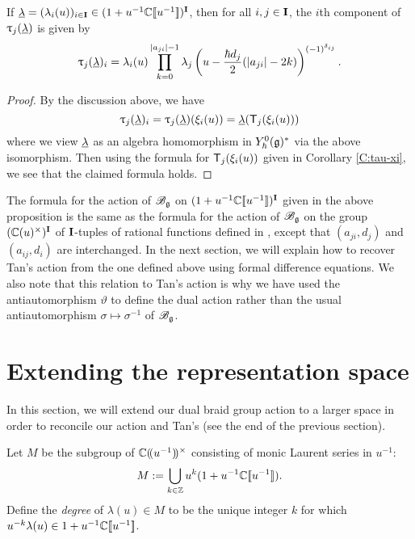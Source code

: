 \begin{proposition}\label{P:Tan-formula}
    If $\ul = (\lambda_i(u))_{i\in\I}\in (1+u^{-1}\C\db{u^{-1}})^\I$, then for all $i,j\in\I$, the $i$th component of $\braid_j(\ul)$ is given by
    \[\braid_j(\ul)_i = \lambda_i(u)\prod_{k=0}^{\abs{a_{ji}}-1}\lambda_j\left(u-\frac{\hbar d_j}{2}(\abs{a_{ji}}-2k)\right)^{(-1)^{\delta_{ij}}}.\]
\end{proposition}
\begin{proof}
    By the discussion above, we have
    \[\braid_j(\ul)_i = \braid_j(\ul)(\xi_i(u)) = \ul(\mbraid_j(\xi_i(u)))\]
    where we view $\ul$ as an algebra homomorphism in $\Yhg[0]^*$ via the above isomorphism.
    Then using the formula for $\mbraid_j(\xi_i(u))$ given in Corollary \ref{C:tau-xi}, we see that the claimed formula holds.
\end{proof}

The formula for the action of $\Bg$ on $(1+u^{-1}\C\db{u^{-1}})^\I$ given in the above proposition is the same as the formula for the action of $\Bg$ on the group $(\C(u)^\times)^\I$ of $\I$-tuples of rational functions defined in \cite[Prop. 3.1]{tan_braid_2015}, except that $(a_{ji}, d_j)$ and $(a_{ij}, d_i)$ are interchanged.
In the next section, we will explain how to recover Tan's action from the one defined above using formal difference equations.
We also note that this relation to Tan's action is why we have used the antiautomorphism $\vartheta$ to define the dual action rather than the usual antiautomorphism $\sigma\mapsto\sigma^{-1}$ of $\Bg$.


\section{Extending the representation space}\label{sec:extending}

In this section, we will extend our dual braid group action to a larger space in order to reconcile our action and Tan's (see the end of the previous section).

Let $M$ be the subgroup of $\C\dparen{u^{-1}}^\times$ consisting of monic Laurent series in $u^{-1}$:
\[M := \bigcup_{k\in\Z}u^{k}(1+u^{-1}\C\db{u^{-1}}).\]
Define the \emph{degree} of $\lambda(u)\in M$ to be the unique integer $k$ for which $u^{-k}\lambda(u)\in 1+u^{-1}\C\db{u^{-1}}$.

